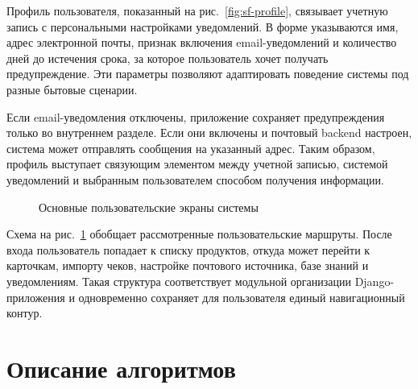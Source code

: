 \documentclass[14pt,a4paper]{extreport}
\renewcommand{\thechapter}{\arabic{chapter}}
\begin{document}
Профиль пользователя, показанный на рис.~\ref{fig:sf-profile}, связывает учетную запись с персональными настройками уведомлений. В форме указываются имя, адрес электронной почты, признак включения email-уведомлений и количество дней до истечения срока, за которое пользователь хочет получать предупреждение. Эти параметры позволяют адаптировать поведение системы под разные бытовые сценарии.

Если email-уведомления отключены, приложение сохраняет предупреждения только во внутреннем разделе. Если они включены и почтовый backend настроен, система может отправлять сообщения на указанный адрес. Таким образом, профиль выступает связующим элементом между учетной записью, системой уведомлений и выбранным пользователем способом получения информации.

\begin{figure}[H]
\centering
{}
\caption{Основные пользовательские экраны системы}
\label{fig:sf-user-screens}
\end{figure}

Схема на рис.~\ref{fig:sf-user-screens} обобщает рассмотренные пользовательские маршруты. После входа пользователь попадает к списку продуктов, откуда может перейти к карточкам, импорту чеков, настройке почтового источника, базе знаний и уведомлениям. Такая структура соответствует модульной организации Django-приложения и одновременно сохраняет для пользователя единый навигационный контур.

\newpage
\chapter[Глава \thechapter Описание алгоритмов]{Описание алгоритмов}
\end{document}
